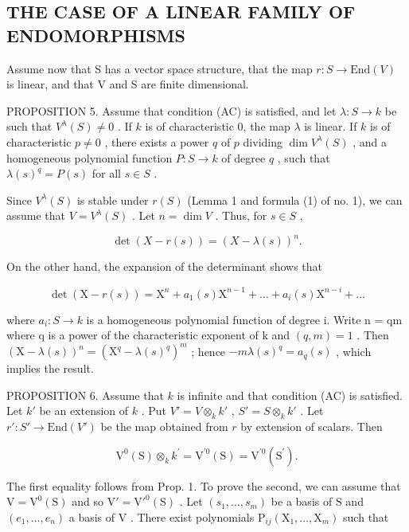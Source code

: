 \subsection{THE CASE OF A LINEAR FAMILY OF ENDOMORPHISMS}

Assume now that S has a vector space structure, that the map \(r : S \to \text{End}(V)\) is linear, and that V and S are finite dimensional.

PROPOSITION 5. Assume that condition (AC) is satisfied, and let \(\lambda : S \to k\) be such that \(V^{\lambda}(S) \neq 0\) . If \(k\) is of characteristic 0, the map \(\lambda\) is linear. If \(k\) is of characteristic \(p \neq 0\) , there exists a power \(q\) of \(p\) dividing \(\dim V^{\lambda}(S)\) , and a homogeneous polynomial function \(P : S \to k\) of degree \(q\) , such that \(\lambda(s)^{q} = P(s)\) for all \(s \in S\) .

Since \(V^{\lambda}(S)\) is stable under \(r(S)\) (Lemma 1 and formula (1) of no. 1), we can assume that \(V = V^{\lambda}(S)\) . Let \(n = \dim V\) . Thus, for \(s \in S\) ,

\[
\det (X - r (s)) = (X - \lambda (s)) ^ {n}.
\]

On the other hand, the expansion of the determinant shows that

\[
\det (\mathrm{X} - r (s)) = \mathrm{X} ^ {n} + a _ {1} (s) \mathrm{X} ^ {n - 1} + \dots + a _ {i} (s) \mathrm{X} ^ {n - i} + \dots
\]

where \(a_{i}: S \to k\) is a homogeneous polynomial function of degree i. Write n = qm where q is a power of the characteristic exponent of k and \((q, m) = 1\) . Then \((\mathrm{X} - \lambda(s))^{n} = (\mathrm{X}^{q} - \lambda(s)^{q})^{m}\) ; hence \(-m\lambda(s)^{q} = a_{q}(s)\) , which implies the result.

PROPOSITION 6. Assume that \(k\) is infinite and that condition (AC) is satisfied. Let \(k'\) be an extension of \(k\) . Put \(V' = V \otimes_k k'\) , \(S' = S \otimes_k k'\) . Let \(r': S' \to \text{End}(V')\) be the map obtained from \(r\) by extension of scalars. Then

\[
\mathrm{V} ^ {0} (\mathrm{S}) \otimes_ {k} k ^ {\prime} = \mathrm{V} ^ {\prime 0} (\mathrm{S}) = \mathrm{V} ^ {\prime 0} (\mathrm{S} ^ {\prime}).
\]

The first equality follows from Prop. 1. To prove the second, we can assume that \(\mathrm{V} = \mathrm{V}^0 (\mathrm{S})\) and so \(\mathrm{V}' = \mathrm{V}'^{0}(\mathrm{S})\) . Let \((s_1,\dots ,s_m)\) be a basis of \(\mathrm{S}\) and \((e_1,\dots ,e_n)\) a basis of \(\mathrm{V}\) . There exist polynomials \(\mathrm{P}_{ij}(\mathrm{X}_1,\dots ,\mathrm{X}_m)\) such that

